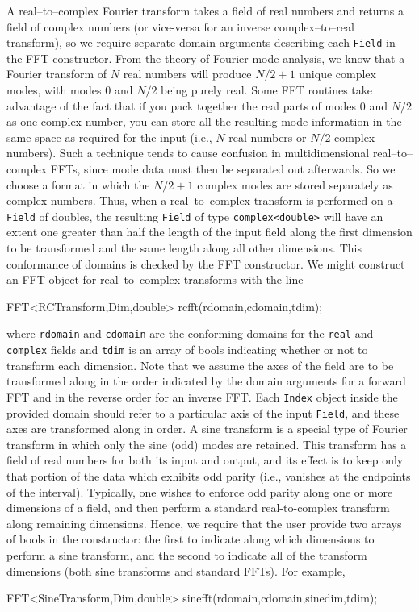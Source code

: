 A real--to--complex Fourier transform takes a field of real numbers and returns a field of complex numbers (or vice-versa for an inverse complex--to--real transform), so we require separate domain arguments describing each \texttt{Field} in the FFT constructor. From the theory of Fourier mode analysis, we know that a Fourier transform of $N$ real numbers will produce $N/2+ 1$ unique complex modes, with modes $0$ and $N/2$ being purely real. Some FFT routines take advantage of the fact that if you pack together the real parts of modes $0$ and $N/2$ as one complex number, you can store all the resulting mode information in the same space as required for the input (i.e., $N$ real numbers or $N/2$ complex numbers). Such a technique tends to cause confusion in multidimensional real--to--complex FFTs, since mode data must then be separated out afterwards. So we choose a format in which the $N/2+ 1$ complex modes are stored separately as complex numbers. Thus, when a real--to--complex transform is performed on a {\tt \texttt{Field}} of doubles, the resulting {\tt \texttt{Field}} of type {\tt complex<double>} will have an extent one greater than half the length of the input field along the first dimension to be transformed and the same length along all other dimensions. This conformance of domains is checked by the FFT constructor. We might construct an FFT object for real--to--complex transforms with the line
\begin{smallcode}
FFT<RCTransform,Dim,double> rcfft(rdomain,cdomain,tdim); 
\end{smallcode}
where {\tt rdomain} and {\tt cdomain} are the conforming domains for the {\tt real} and {\tt complex} fields and {\tt tdim} is an array of bools indicating whether or not to transform each dimension. Note that we assume the axes of the field are to be transformed along in the order indicated by the domain arguments for a forward FFT and in the reverse order for an inverse FFT. Each \texttt{Index} object inside the provided domain should refer to a particular axis of the input \texttt{Field}, and these axes are transformed along in order. A sine transform is a special type of Fourier transform in which only the sine (odd) modes are retained. This transform has a field of real numbers for both its input and output, and its effect is to keep only that portion of the data which exhibits odd parity (i.e., vanishes at the endpoints of the interval). Typically, one wishes to enforce odd parity along one or more dimensions of a field, and then perform a standard real-to-complex transform along remaining dimensions. Hence, we require that the user provide two arrays of bools in the constructor: the first to indicate along which dimensions to perform a sine transform, and the second to indicate all of the transform dimensions (both sine transforms and standard FFTs). For example,
\begin{smallcode}
FFT<SineTransform,Dim,double> sinefft(rdomain,cdomain,sinedim,tdim);
\end{smallcode}
 

